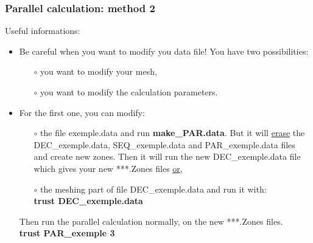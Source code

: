 \documentclass[10pt]{beamer}
\begin{document}
\begin{frame}
\frametitle{Parallel calculation: method 2}
\begin{block}{Useful informations:}

\begin{itemize}
\item Be careful when you want to modify you data file! You have two possibilities:
    \begin{itemize} 
    \item [$\circ$] you want to modify your mesh,
    \item [$\circ$] you want to modify the calculation parameters.
    \end{itemize}

\item For the first one, you can modify:
    \begin{itemize} 
    \item [$\circ$] the file exemple.data and run \textbf{make\_PAR.data}. But it will \underline{erase} the DEC\_exemple.data, SEQ\_exemple.data and PAR\_exemple.data files and create new zones. Then it will run the new DEC\_exemple.data file which gives your new ***.Zones files \underline{or},
    \item [$\circ$] the meshing part of file DEC\_exemple.data and run it with:\\
    \textbf{trust DEC\_exemple.data} \\
    \end{itemize}
Then run the parallel calculation normally, on the new ***.Zones files.\\
\textbf{trust PAR\_exemple 3}

\end{itemize}

\end{block}
\end{frame}
\end{document}
